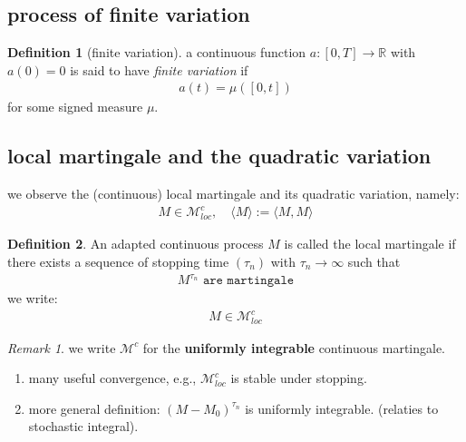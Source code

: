 \documentclass[a4paper,11pt]{book}
\theoremstyle{definition}
\newtheorem{definition}{Definition}[section]
\theoremstyle{remark}
\newtheorem*{remark}{Remark}
\begin{document}
\subsection{process of finite variation}
\begin{definition}[finite variation]
	a continuous function $a: [0, T] \rightarrow\mathbb{R}$ with $a(0) = 0$ is said to have \textit{finite variation} if 
	\begin{align*}
		a(t) = \mu([0, t])
	\end{align*}
	for some signed measure $\mu$. 
\end{definition}

\subsection{local martingale and the quadratic variation}

we observe the (continuous) local martingale and its quadratic variation, namely:
\begin{align*}
	M \in \mathcal{M}^c_{loc}, \quad \langle M \rangle := \langle M , M \rangle
\end{align*}

\begin{definition}
	An adapted continuous process $M$ is called the local martingale if there exists a sequence of stopping time $(\tau_n)$ with $\tau_n \rightarrow \infty$ such that
	\begin{align*}
		M^{\tau_n} \texttt{ are martingale}
	\end{align*}
	we write:
	\begin{align*}
		M \in \mathcal{M}_{loc}^c
	\end{align*}
\end{definition}
\begin{remark}
we write $\mathcal{M}^c$ for the \textbf{uniformly integrable} continuous martingale. 
\begin{enumerate}
	\item many useful convergence, e.g., $\mathcal{M}^c_{loc}$ is stable under stopping. 
	\item more general definition: $(M - M_0)^{\tau_n}$ is uniformly integrable. (relaties to stochastic integral). 
\end{enumerate}	
\end{remark}
\end{document}

